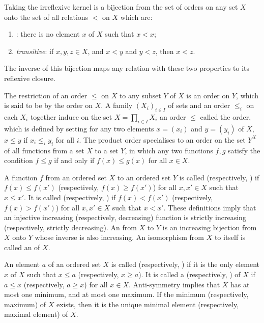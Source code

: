 \documentclass{article}
\begin{document}
Taking the irreflexive kernel is a bijection from the set of orders on
any set \(X\) onto the set of all relations \(<\) on \(X\) which are:
\begin{enumerate}
\item {}: there is no element \(x\) of \(X\) such
  that \(x < x\);
\item \emph{transitive}: if \(x,y,z \in X\), and \(x < y\) and
  \(y < z\), then \(x < z\).
\end{enumerate}
The inverse of this bijection maps any relation with these two
properties to its reflexive closure.

The restriction of an order \(\leq\) on \(X\) to any subset \(Y\) of
\(X\) is an order on \(Y\), which is said to be  by
the order on \(X\).  A family \((X_i)_{i \in I}\) of sets and an order
\(\leq_i\) on each \(X_i\) together induce on the set
\(X = \prod_{i \in I}X_i\) an order \(\leq\) called the
 order, which is defined by setting for any two
elements \(x= (x_i)\) and \(y = (y_i)\) of \(X\), \(x \leq y\) if
\(x_i \leq_i y_i\) for all \(i\).  The product order specialises to an
order on the set \(Y^X\) of all functions from a set \(X\) to a set
\(Y\), in which any two functions \(f,g\) satisfy the condition
\(f \leq g\) if and only if \(f(x) \leq g(x)\) for all \(x \in X\).

A function \(f\) from an ordered set \(X\) to an ordered set \(Y\) is
called  (respectively, )
if \(f(x) \leq f(x')\) (respectively, \(f(x) \geq f(x')\)) for all
\(x, x' \in X\) such that \(x \leq x'\).  It is called
 (respectively, ) if \(f(x) < f(x')\) (respectively, \(f(x) > f(x')\))
for all \(x, x' \in X\) such that \(x < x'\).  These definitions imply
that an injective increasing (respectively, decreasing) function is
strictly increasing (respectively, strictly decreasing).  An
 from \(X\) to \(Y\) is an increasing bijection
from \(X\) onto \(Y\) whose inverse is also increasing.  An
isomorphism from \(X\) to itself is called an 
of \(X\).

An element \(a\) of an ordered set \(X\) is called 
(respectively, ) if it is the only element \(x\) of
\(X\) such that \(x \leq a\) (respectively, \(x \geq a\)).  It is
called a  (respectively, ) of
\(X\) if \(a \leq x\) (respectively, \(a \geq x\)) for all
\(x \in X\).  Anti-symmetry implies that \(X\) has at most one
minimum, and at most one maximum.  If the minimum (respectively,
maximum) of \(X\) exists, then it is the unique minimal element
(respectively, maximal element) of \(X\).
\end{document}

